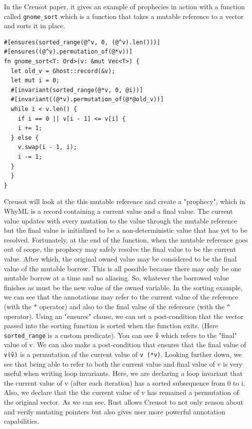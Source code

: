\documentclass[12pt]{article}
\begin{document}
In the Creusot paper, it gives an example of prophecies in action with a function called \texttt{gnome\_sort} which is a function that takes a mutable reference to a vector and sorts it in place. 

\begin{verbatim}
#[ensures(sorted_range(@^v, 0, (@^v).len()))]
#[ensures((@^v).permutation_of(@*v))]
fn gnome_sort<T: Ord>(v: &mut Vec<T>) {
  let old_v = Ghost::record(&v);
  let mut i = 0;
  #[invariant(sorted_range(@*v, 0, @i))]
  #[invariant((@*v).permutation_of(@*@old_v))]
  while i < v.len() {
    if i == 0 || v[i - 1] <= v[i] {
    i += 1;
  } else {
    v.swap(i - 1, i);
    i -= 1;
  }
  }
}
\end{verbatim} 

Creusot will look at the this mutable reference and create a "prophecy", which in WhyML is a record containing a current value and a final value. 
The current value updates with every mutation to the value through the mutable reference but the final value is initialized to be a non-deterministic value that has yet to be resolved. 
Fortunately, at the end of the function, when the mutable reference goes out of scope, the prophecy may safely resolve the final value to be the current value.
After which, the original owned value may be considered to be the final value of the mutable borrow. 
This is all possible because there may only be one mutable borrow at a time and no aliasing. 
So, whatever the borrowed value finishes as must be the new value of the owned variable. 
In the sorting example, we can see that the annotations may refer to the current value of the reference (with the * operator) and also to the final value of the reference (with the \texttt{\^} operator).
Using an "ensures" clause, we can set a post-condition that the vector passed into the sorting function is sorted when the function exits. 
(Here \texttt{sorted\_range} is a custom predicate). 
You can see \texttt{\^v} which refers to the "final" value of v. 
We can also make a post-condition that ensures that the final value of \texttt{v(\^v)} is a permutation of the current value of \texttt{v (*v)}.
Looking further down, we see that being able to refer to both the current value and final value of v is very useful when writing loop invariants. 
Here, we are declaring a loop invariant that the current value of v (after each iteration) has a sorted subsequence from 0 to i. 
Also, we declare that the the current value of v has remained a permutation of the original vector.  
As we can see, Rust allows Creusot to not only reason about and verify mutating pointers but also gives user more powerful annotation capabilities. 
\end{document}

